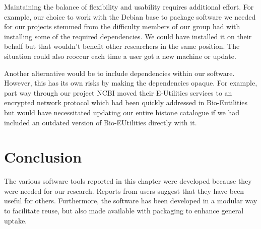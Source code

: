 Maintaining the balance of flexibility and usability requires
additional effort.
For example, our choice to work with the Debian base to package software we
needed for our projects stemmed from the difficulty members of our group
had with installing some of the required dependencies.  We could have
installed it on their behalf but that wouldn't benefit other
researchers in the same position.
The situation could also reoccur each time a user got a new
machine or update.

Another alternative would be to include
dependencies within our software.  However, this has its own risks by
making the dependencies opaque.  For example, part way through our project
NCBI moved their E-Utilities services to an encrypted network protocol which had
been quickly addressed in Bio-Eutilities
but would have necessitated updating our
entire histone catalogue  if we had
included an outdated version of Bio-EUtilities directly with it.

\section{Conclusion}

The various software tools reported in this chapter were developed
because they were needed for our research.  Reports from users suggest
that they have been useful for others.  Furthermore, the software has
been developed in a modular way to facilitate reuse, but also made
available with packaging to enhance general uptake.
